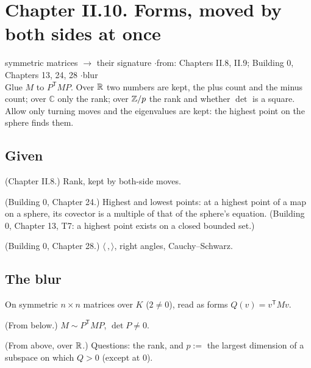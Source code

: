 \section*{Chapter II.10. Forms, moved by both sides at once}
\begin{center}
{\normalsize symmetric matrices $\to$ their signature \quad$\cdot$\quad from: Chapters II.8, II.9; Building 0, Chapters 13, 24, 28 \quad$\cdot$\quad blur}\\[4pt]
{\small Glue $M$ to $P^{\mathsf T} M P$. Over $\mathbb{R}$ two numbers are kept, the plus count and the minus count; over $\mathbb{C}$ only the rank; over $\mathbb{Z}/p$ the rank and whether $\det$ is a square. Allow only turning moves and the eigenvalues are kept: the highest point on the sphere finds them.}
\end{center}

\subsection*{Given}

\begin{lines}
\item[\lab{G1}] (Chapter II.8.) Rank, kept by both-side moves.
\item[\lab{G2}] (Building 0, Chapter 24.) Highest and lowest points: at a highest point of a map on a sphere, its covector is a multiple of that of the sphere's equation. (Building 0, Chapter 13, T7: a highest point exists on a closed bounded set.)
\item[\lab{G3}] (Building 0, Chapter 28.) $\langle \,,\rangle$, right angles, Cauchy--Schwarz.
\end{lines}

\subsection*{The blur}

On symmetric $n \times n$ matrices over $K$ ($2 \ne 0$), read as forms $Q(v) = v^{\mathsf T} M v$.

\begin{lines}
\item[\lab{B1}] (From below.) $M \sim P^{\mathsf T} M P$, $\det P \ne 0$.
\item[\lab{B2}] (From above, over $\mathbb{R}$.) Questions: the rank, and $p :=$ the largest dimension of a subspace on which $Q > 0$ (except at $0$).
\end{lines}


